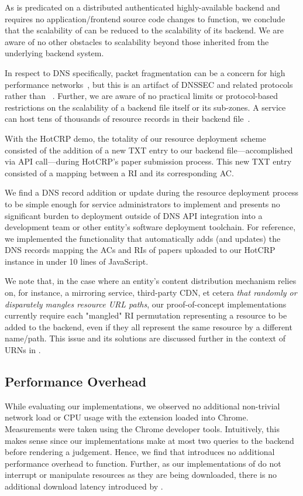 As \SYSTEM{} is predicated on a distributed authenticated highly-available
backend and requires no application/frontend source code changes to function, we
conclude that the scalability of \SYSTEM{} can be reduced to the scalability of
its backend. We are aware of no other obstacles to scalability beyond those
inherited from the underlying backend system.

In respect to DNS specifically, packet fragmentation can be a concern for high
performance networks~\cite{EDNS}, but this is an artifact of DNSSEC and related
protocols rather than \SYSTEM{}~\cite{DNSSEC}. Further, we are aware of no
practical limits or protocol-based restrictions on the scalability of a backend
file itself or its sub-zones. A service can host tens of thousands of resource
records in their backend file~\cite{DNS1, DNS2}.

With the HotCRP demo, the totality of our resource deployment scheme consisted
of the addition of a new TXT entry to our backend file---accomplished via API
call---during HotCRP's paper submission process. This new TXT entry consisted of
a mapping between a RI and its corresponding AC.

We find a DNS record addition or update during the resource deployment process
to be simple enough for service administrators to implement and presents no
significant burden to deployment outside of DNS API integration into a
development team or other entity's software deployment toolchain. For reference,
we implemented the functionality that automatically adds (and updates) the DNS
records mapping the ACs and RIs of papers uploaded to our HotCRP instance in
under 10 lines of JavaScript.

We note that, in the case where an entity's content distribution mechanism
relies on, for instance, a mirroring service, third-party CDN, et cetera
\emph{that randomly or disparately mangles resource URL paths}, our
proof-of-concept implementations currently require each "mangled" RI permutation
representing a resource to be added to the backend, even if they all represent
the same resource by a different name/path. This issue and its solutions are
discussed further in the context of URNs in .

\subsection{Performance Overhead}

While evaluating our \SYSTEM{} implementations, we observed no additional
non-trivial network load or CPU usage with the extension loaded into Chrome.
Measurements were taken using the Chrome developer tools. Intuitively, this
makes sense since our \SYSTEM{} implementations make at most two queries to the
backend before rendering a judgement. Hence, we find that \SYSTEM{} introduces
no additional performance overhead to function. Further, as our implementations
of \SYSTEM{} do not interrupt or manipulate resources as they are being
downloaded, there is no additional download latency introduced by \SYSTEM{}.

